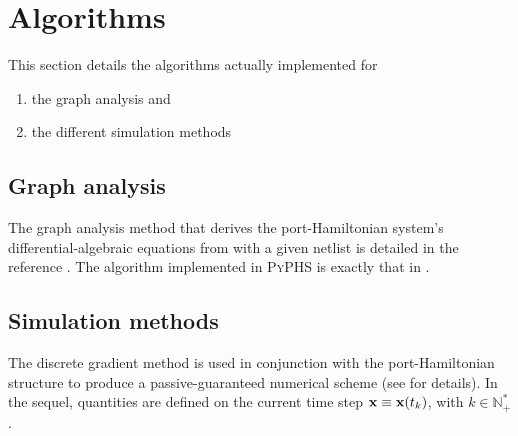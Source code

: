 \documentclass[10pt,a4paper]{article}
\begin{document}
\section{Algorithms}
%
This section details the algorithms actually implemented for 
%
\begin{enumerate}
%
\item the graph analysis and\\
%
\item the different simulation methods
%
\end{enumerate}
%
\subsection{Graph analysis}
%
The graph analysis method that derives the port-Hamiltonian system's differential-algebraic equations from with a given netlist is detailed in the reference \cite{falaize2016apassive}.
%
The algorithm implemented in \textsc{PyPHS} is exactly that in \cite[algorithm 1]{falaize2016apassive}.
%
\subsection{Simulation methods}
%
The discrete gradient method is used in conjunction with the port-Hamiltonian structure to produce a passive-guaranteed numerical scheme (see \cite{falaize2016apassive} for details).
%
In the sequel, quantities are defined on the current time step ${\mathbf{x}}\equiv{\mathbf{x}}(t_k)$, with $k\in\mathbb{N}_{+}^{*}$.
%
\end{document}
